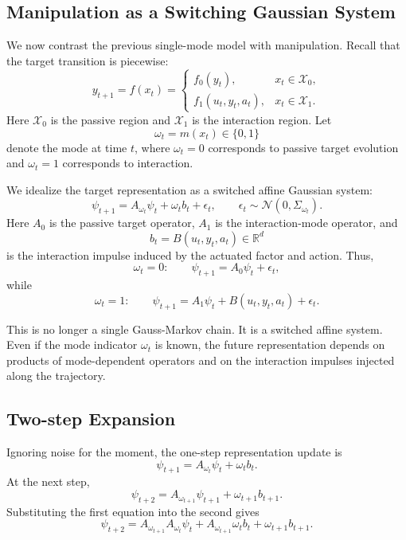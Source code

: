 \subsection{Manipulation as a Switching Gaussian System}

We now contrast the previous single-mode model with manipulation. Recall that the target transition is piecewise:
\begin{equation}
y_{t+1}
=
f(x_t)
=
\begin{cases}
f_0(y_t), & x_t\in\mathcal X_0,\\
f_1(u_t,y_t,a_t), & x_t\in\mathcal X_1.
\end{cases}
\end{equation}
Here \(\mathcal X_0\) is the passive region and \(\mathcal X_1\) is the interaction region. Let
\[
\omega_t=m(x_t)\in\{0,1\}
\]
denote the mode at time \(t\), where \(\omega_t=0\) corresponds to passive target evolution and \(\omega_t=1\) corresponds to interaction.

We idealize the target representation as a switched affine Gaussian system:
\begin{equation}
\psi_{t+1}
=
A_{\omega_t}\psi_t
+
\omega_t b_t
+
\epsilon_t,
\qquad
\epsilon_t\sim\mathcal N(0,\Sigma_{\omega_t}).
\end{equation}
Here \(A_0\) is the passive target operator, \(A_1\) is the interaction-mode operator, and
\[
b_t=B(u_t,y_t,a_t)\in\mathbb R^d
\]
is the interaction impulse induced by the actuated factor and action. Thus,
\begin{equation}
\omega_t=0:
\qquad
\psi_{t+1}=A_0\psi_t+\epsilon_t,
\end{equation}
while
\begin{equation}
\omega_t=1:
\qquad
\psi_{t+1}=A_1\psi_t+B(u_t,y_t,a_t)+\epsilon_t.
\end{equation}

This is no longer a single Gauss-Markov chain. It is a switched affine system. Even if the mode indicator \(\omega_t\) is known, the future representation depends on products of mode-dependent operators and on the interaction impulses injected along the trajectory.

\subsection{Two-step Expansion}

Ignoring noise for the moment, the one-step representation update is
\begin{equation}
\psi_{t+1}
=
A_{\omega_t}\psi_t+\omega_t b_t.
\end{equation}
At the next step,
\begin{equation}
\psi_{t+2}
=
A_{\omega_{t+1}}\psi_{t+1}
+
\omega_{t+1}b_{t+1}.
\end{equation}
Substituting the first equation into the second gives
\begin{equation}
\psi_{t+2}
=
A_{\omega_{t+1}}A_{\omega_t}\psi_t
+
A_{\omega_{t+1}}\omega_t b_t
+
\omega_{t+1}b_{t+1}.
\end{equation}

